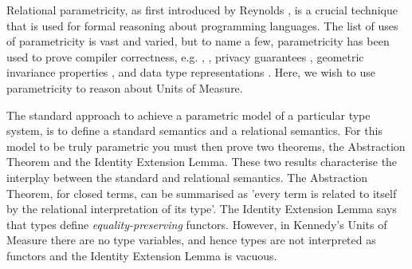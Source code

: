 \documentclass[a4paper,UKenglish]{lipics}
\newcommand{\UoM}{Units of Measure\xspace}
\newcommand{\msf}[1]{\mathsf{#1}} %
\newcommand{\Ab}{\msf{Ab}}
\newcommand{\Set}{\msf{Set}}
\newcommand{\Sub}[1]{\msf{Sub}(#1)}
\newcommand{\Rel}{\msf{Rel}}
\newcommand{\blank}{\, \underline{\hspace{2mm}} \,}
\newcommand{\GroupSet}[1]{#1/\!/\Set}
\newcommand{\AbSet}{\GroupSet{\Ab}}
\begin{document}

Relational parametricity, as first introduced by Reynolds \cite{reynolds1983types} , is a crucial technique that is used for formal reasoning about programming languages. The list of uses of parametricity is vast and varied, but to name a few, parametricity has been used to prove compiler correctness, e.g. \cite{benton2009biorthogonality}, \cite{ahmed2008typed}, privacy guarantees \cite{reed2010distance}, geometric invariance properties \cite{atkey2013abstraction}, and data type representations \cite{hasegawa1994categorical}. Here, we wish to use parametricity to reason about \UoM.

The standard approach to achieve a parametric model of a particular type system, is to define a standard semantics and a relational semantics. For this model to be truly parametric you must then prove two theorems, the Abstraction Theorem and the Identity Extension Lemma. These two results characterise the interplay between the standard and relational semantics. The Abstraction Theorem, for closed terms, can be summarised as 'every term is related to itself by the relational interpretation of its type'. The Identity Extension Lemma says that types define \emph{equality-preserving} functors. However, in Kennedy's \UoM there are no type variables, and hence types are not  interpreted as functors and the Identity Extension Lemma is vacuous.
\end{document}
